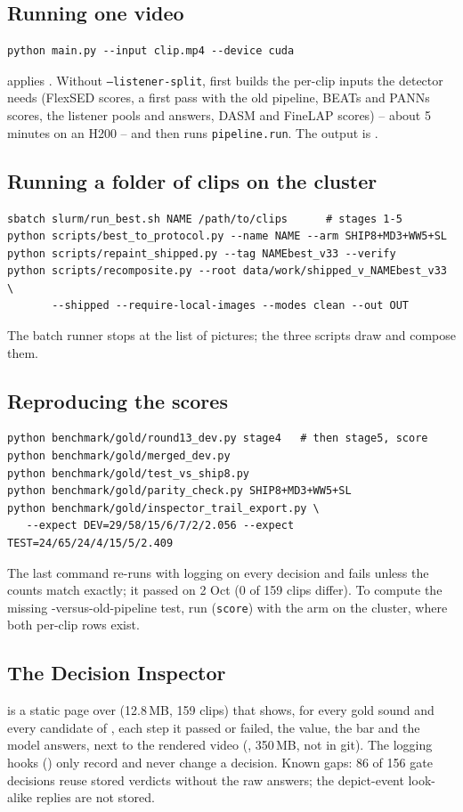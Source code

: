 \subsection{Running one video}
\begin{verbatim}
python main.py --input clip.mp4 --device cuda
\end{verbatim}
 applies . Without \texttt{--listener-split},  first builds the
per-clip inputs the detector needs (FlexSED scores, a first pass with the old pipeline, BEATs and PANNs scores, the
listener pools and answers, DASM and FineLAP scores) -- about 5 minutes on an H200 -- and then runs
\texttt{pipeline.run}. The output is .

\subsection{Running a folder of clips on the cluster}
\begin{verbatim}
sbatch slurm/run_best.sh NAME /path/to/clips      # stages 1-5
python scripts/best_to_protocol.py --name NAME --arm SHIP8+MD3+WW5+SL
python scripts/repaint_shipped.py --tag NAMEbest_v33 --verify
python scripts/recomposite.py --root data/work/shipped_v_NAMEbest_v33 \
       --shipped --require-local-images --modes clean --out OUT
\end{verbatim}
The batch runner stops at the list of pictures; the three scripts draw and compose them.

\subsection{Reproducing the scores}
\begin{verbatim}
python benchmark/gold/round13_dev.py stage4   # then stage5, score
python benchmark/gold/merged_dev.py
python benchmark/gold/test_vs_ship8.py
python benchmark/gold/parity_check.py SHIP8+MD3+WW5+SL
python benchmark/gold/inspector_trail_export.py \
   --expect DEV=29/58/15/6/7/2/2.056 --expect TEST=24/65/24/4/15/5/2.409
\end{verbatim}
The last command re-runs \Dp{} with logging on every decision and fails unless the counts match exactly; it passed on
2 Oct (0 of 159 clips differ). To compute the missing \Dp-versus-old-pipeline test, run  (\texttt{score}) with
the \Dp{} arm on the cluster, where both per-clip rows exist.

\subsection{The Decision Inspector}
 is a static page over  (12.8\,MB, 159 clips) that shows, for every gold sound and every
candidate of \Dp, each step it passed or failed, the value, the bar and the model answers, next to the rendered video
(\fp{docs/inspector/media/bysig/}, 350\,MB, not in git). The logging hooks (\fp{src/trail.py}) only record and never
change a decision. Known gaps: 86 of 156 gate decisions reuse stored verdicts without the raw answers; the depict-event
look-alike replies are not stored.

